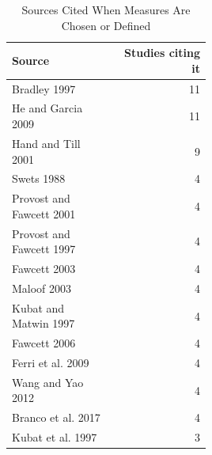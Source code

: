 \begin{table}[t]
  \caption{Sources Cited When Measures Are Chosen or Defined}
  \label{tab:empirical-measure-sources}
  \footnotesize
  \setlength{\tabcolsep}{6pt}
  \begin{tabular}{@{}>{\raggedright\arraybackslash}p{0.5\linewidth}r@{}}
    \toprule
    Source & Studies citing it\\
    \midrule
    Bradley 1997 & 11\\
    He and Garcia 2009 & 11\\
    Hand and Till 2001 & 9\\
    Swets 1988 & 4\\
    Provost and Fawcett 2001 & 4\\
    Provost and Fawcett 1997 & 4\\
    Fawcett 2003 & 4\\
    Maloof 2003 & 4\\
    Kubat and Matwin 1997 & 4\\
    Fawcett 2006 & 4\\
    Ferri et al. 2009 & 4\\
    Wang and Yao 2012 & 4\\
    Branco et al. 2017 & 4\\
    Kubat et al. 1997 & 3\\
    \bottomrule
  \end{tabular}
\end{table}

